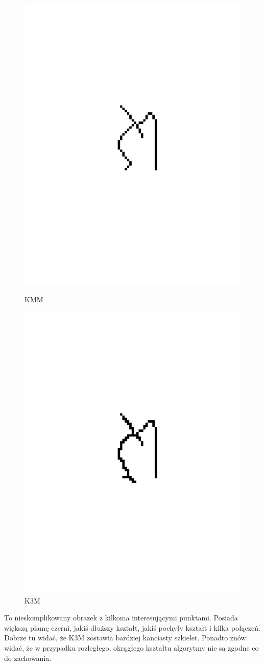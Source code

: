 \documentclass[11pt]{article}
\begin{document}
\begin{figure}[!ht]
\begin{minipage}[b]{0.5\linewidth}
    \centering
    \includegraphics[width=.5\linewidth]{../samples/sample1_kmm} 
    \caption{KMM} 
    \vspace{4ex}
  \end{minipage}%
  \begin{minipage}[b]{0.5\linewidth}
    \centering
    \includegraphics[width=.5\linewidth]{../samples/sample1_k3m} 
    \caption{K3M} 
    \vspace{4ex}
  \end{minipage} 
\end{figure}
\FloatBarrier

\par
To nieskomplikowany obrazek z kilkoma interesującymi punktami. Posiada większą plamę czerni, jakiś dłuższy kształt, jakiś pochyły kształt i kilka połączeń. Dobrze tu widać, że K3M zostawia bardziej kanciasty szkielet. Ponadto znów widać, że w przypadku rozległego, okrągłego kształtu algorytmy nie są zgodne co do zachowania.
\end{document}
